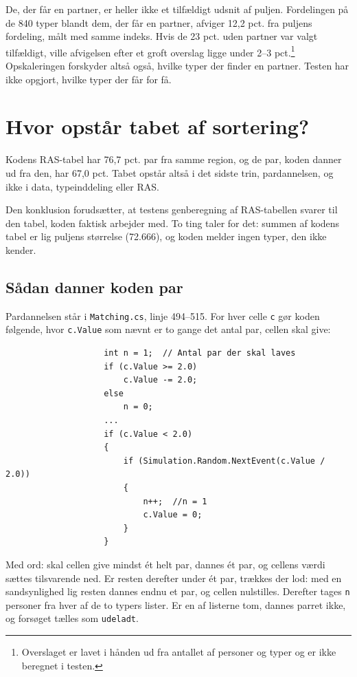 \documentclass[11pt,a4paper]{article}
\newcommand{\kode}[1]{\texttt{#1}}
\begin{document}
De, der får en partner, er heller ikke et tilfældigt udsnit af puljen. Fordelingen på de 840 typer
blandt dem, der får en partner, afviger 12,2 pct. fra puljens fordeling, målt med samme indeks. Hvis
de 23 pct. uden partner var valgt tilfældigt, ville afvigelsen efter et groft overslag ligge under
2--3 pct.\footnote{Overslaget er lavet i hånden ud fra antallet af personer og typer og er ikke
beregnet i testen.} Opskaleringen forskyder altså også, hvilke typer der finder en partner. Testen
har ikke opgjort, hvilke typer der får for få.


\section{Hvor opstår tabet af sortering?}\label{sec:fortolkning}

Kodens RAS-tabel har 76,7 pct. par fra samme region, og de par, koden danner ud fra den, har 67,0
pct. Tabet opstår altså i det sidste trin, pardannelsen, og ikke i data, typeinddeling eller RAS.

Den konklusion forudsætter, at testens genberegning af RAS-tabellen svarer til den tabel, koden
faktisk arbejder med. To ting taler for det: summen af kodens tabel er lig puljens størrelse
(72.666), og koden melder ingen typer, den ikke kender.

\subsection{Sådan danner koden par}

Pardannelsen står i \kode{Matching.cs}, linje 494--515. For hver celle \kode{c} gør koden følgende,
hvor \kode{c.Value} som nævnt er to gange det antal par, cellen skal give:

{\small
\begin{verbatim}
                    int n = 1;  // Antal par der skal laves
                    if (c.Value >= 2.0)
                        c.Value -= 2.0;
                    else
                        n = 0;
                    ...
                    if (c.Value < 2.0)
                    {
                        if (Simulation.Random.NextEvent(c.Value / 2.0))
                        {
                            n++;  //n = 1
                            c.Value = 0;
                        }
                    }
\end{verbatim}
}

Med ord: skal cellen give mindst ét helt par, dannes ét par, og cellens værdi sættes tilsvarende ned.
Er resten derefter under ét par, trækkes der lod: med en sandsynlighed lig resten dannes endnu et
par, og cellen nulstilles. Derefter tages \kode{n} personer fra hver af de to typers lister. Er en
af listerne tom, dannes parret ikke, og forsøget tælles som \kode{udeladt}.
\end{document}
